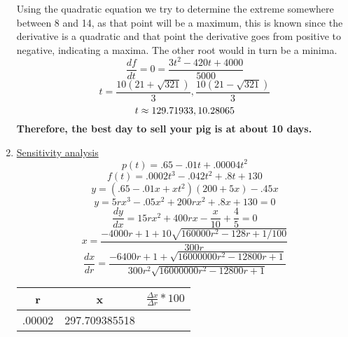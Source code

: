 \documentclass{article}
\begin{document}
\begin{enumerate}[label=\alph*]
    \endgraf
    Using the quadratic equation we try to determine the extreme somewhere between 8 and 14, as that point will be a maximum, this is known since the derivative is a quadratic and that point the derivative goes from positive to negative, indicating a maxima. The other root would in turn be a minima.
    $$\frac{df}{dt}=0=\frac{3t^2-420t+4000}{5000}$$ $$t=\frac{10(21+\sqrt{321})}{3},\frac{10(21-\sqrt{321})}{3}$$
    $$t \approx \pgfmathparse{(10*(21+321^(1/2)))/3}\pgfmathresult , \pgfmathparse{(10*(21-321^(1/2)))/3}\pgfmathresult $$
    \textbf{Therefore, the best day to sell your pig is at about 10 days.}
    
    \item \underline{Sensitivity analysis}
    \endgraf
    $$p(t)=.65-.01t+.00004t^2$$
    $$f(t)=.0002t^3-.042t^2+.8t+130$$
    $$y=(.65-.01x+xt^2)(200+5x)-.45x$$
    $$y=5rx^3-.05x^2+200rx^2+.8x+130=0$$
    $$\frac{dy}{dx}=15rx^2+400rx-\frac{x}{10}+\frac{4}{5}=0$$
    $$x=\frac{-4000r+1+ 10\sqrt{160000r^2-128r+1/100}}{300r}$$
    $$\frac{dx}{dr}=\frac{-6400r+1+ \sqrt{16000000r^2-12800r+1}}{300r^2\sqrt{16000000r^2-12800r+1}}$$
    \begin{center}
            \begin{tabular}{ |c|c|c| } 
            \hline 
            r & x & $\frac{\Delta x}{\Delta r} * 100$ \\
            \hline
            .00002 & 297.709385518&
             

\end{tabular}
\end{center}
\end{enumerate}
\end{document}
